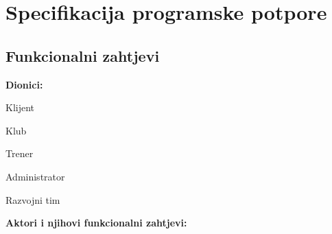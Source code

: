 \chapter{Specifikacija programske potpore}
		
	\section{Funkcionalni zahtjevi}
	\bigskip
		
			\noindent \textbf{Dionici:}
			
			\begin{packed_enum}
				
				\item Klijent
				\item Klub
				\item Trener
				\item Administrator
				\item Razvojni tim
				
			\end{packed_enum}
		\bigskip
		\bigskip
	
		
			
			\noindent \textbf{Aktori i njihovi funkcionalni zahtjevi:}
			\bigskip
		

